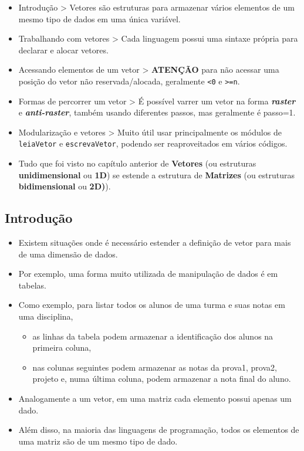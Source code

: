 \documentclass[12pt,a4paper]{article}
\providecommand{\tightlist}{%
      \setlength{\itemsep}{0pt}\setlength{\parskip}{0pt}}
\begin{document}
    \begin{itemize}
\item
  Introdução \textgreater{} Vetores são estruturas para armazenar vários
  elementos de um mesmo tipo de dados em uma única variável.
\item
  Trabalhando com vetores \textgreater{} Cada linguagem possui uma
  sintaxe própria para declarar e alocar vetores.
\item
  Acessando elementos de um vetor \textgreater{} \textbf{ATENÇÃO} para
  não acessar uma posição do vetor não reservada/alocada, geralmente
  \texttt{\textless{}0} e \texttt{\textgreater{}=n}.
\item
  Formas de percorrer um vetor \textgreater{} É possível varrer um vetor
  na forma \textbf{\emph{raster}} e \textbf{\emph{anti-raster}}, também
  usando diferentes passos, mas geralmente é passo=1.
\item
  Modularização e vetores \textgreater{} Muito útil usar principalmente
  os módulos de \texttt{leiaVetor} e \texttt{escrevaVetor}, podendo ser
  reaproveitados em vários códigos.
\item
  Tudo que foi visto no capítulo anterior de \textbf{Vetores} (ou
  estruturas \textbf{unidimensional} ou \textbf{1D}) se estende a
  estrutura de \textbf{Matrizes} (ou estruturas \textbf{bidimensional}
  ou \textbf{2D)}).
\end{itemize}

    \hypertarget{introduuxe7uxe3o}{%
\subsection{Introdução}\label{introduuxe7uxe3o}}

    \begin{itemize}
\item
  Existem situações onde é necessário estender a definição de vetor para
  mais de uma dimensão de dados.
\item
  Por exemplo, uma forma muito utilizada de manipulação de dados é em
  tabelas.
\item
  Como exemplo, para listar todos os alunos de uma turma e suas notas em
  uma disciplina,

  \begin{itemize}
  \tightlist
  \item
    as linhas da tabela podem armazenar a identificação dos alunos na
    primeira coluna,
  \item
    nas colunas seguintes podem armazenar as notas da prova1, prova2,
    projeto e, numa última coluna, podem armazenar a nota final do
    aluno.
  \end{itemize}
\item
  Analogamente a um vetor, em uma matriz cada elemento possui apenas um
  dado.
\item
  Além disso, na maioria das linguagens de programação, todos os
  elementos de uma matriz são de um mesmo tipo de dado.
\end{itemize}
\end{document}
